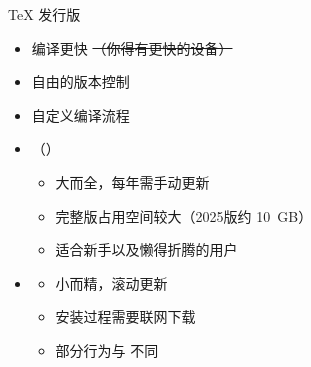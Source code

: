 \begin{frame}{\TeX{} 发行版}
  \begin{itemize}
    \item 编译更快 \sout{（你得有更快的设备）}
    \item 自由的版本控制
    \item<+-> 自定义编译流程
    \item<+-> \textbf{\TeXLive{}}（\textbf{\MacTeX{}}）
      \begin{itemize}
        \item 大而全，每年需手动更新
        \item 完整版占用空间较大（2025版约 \qty{10}{GB}）
        \item 适合新手以及懒得折腾的用户
      \end{itemize}
    \item<+-> \textbf{\MiKTeX{}}
      \begin{itemize}
        \item 小而精，滚动更新
        \item 安装过程需要联网下载
        \item 部分行为与 \TeXLive{} 不同
      \end{itemize}
  \end{itemize}
\end{frame}

